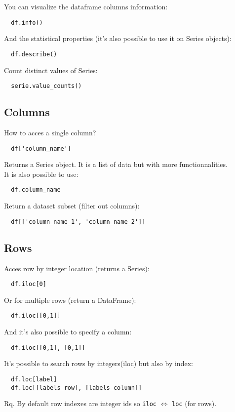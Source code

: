 \documentclass[french]{article}
\begin{document}
You can visualize the dataframe columns information:
\begin{lstlisting}
  df.info()
\end{lstlisting}

And the statistical properties (it's also possible to use it on Series objects): 
\begin{lstlisting}
  df.describe()
\end{lstlisting}


Count distinct values of Series:
\begin{lstlisting}
  serie.value_counts()
\end{lstlisting}

\subsection{Columns}

How to acces a single column?
\begin{lstlisting}
  df['column_name']
\end{lstlisting}
Returns a Series object. It is a list of data but with more functionnalities.\\
It is also possible to use:
\begin{lstlisting}
  df.column_name
\end{lstlisting}
Return a dataset subset (filter out columns):
\begin{lstlisting}
  df[['column_name_1', 'column_name_2']]
\end{lstlisting}

\subsection{Rows}
Acces row by integer location (returns a Series):
\begin{lstlisting}
  df.iloc[0]
\end{lstlisting}
Or for multiple rows (return a DataFrame):
\begin{lstlisting}
  df.iloc[[0,1]]
\end{lstlisting}
And it's also possible to specify a column:
\begin{lstlisting}
  df.iloc[[0,1], [0,1]]
\end{lstlisting}
It's possible to search rows by integers(iloc) but also by index:
\begin{lstlisting}
  df.loc[label]
  df.loc[[labels_row], [labels_column]]
\end{lstlisting}
Rq. By default row indexes are integer ids so \verb|iloc| $\Leftrightarrow$ \verb|loc| (for rows). \\
\end{document}
